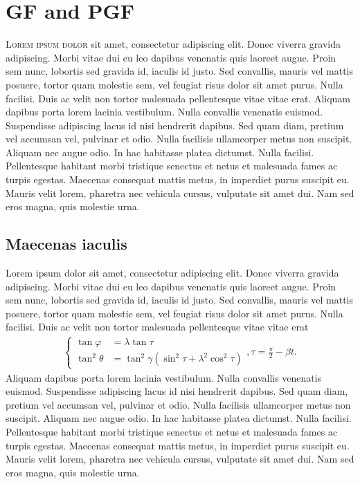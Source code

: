 \chapter{GF and PGF}
\lettrine[lines=4, loversize=-0.1, lraise=0.1]{L}{orem ipsum dolor} sit amet, consectetur adipiscing elit. Donec viverra gravida adipiscing. Morbi vitae dui eu leo dapibus venenatis quis laoreet augue. Proin sem nunc, lobortis sed gravida id, iaculis id justo. Sed convallis, mauris vel mattis posuere, tortor quam molestie sem, vel feugiat risus dolor sit amet purus. Nulla facilisi. Duis ac velit non tortor malesuada pellentesque vitae vitae erat. Aliquam dapibus porta lorem lacinia vestibulum. Nulla convallis venenatis euismod. Suspendisse adipiscing lacus id nisi hendrerit dapibus. Sed quam diam, pretium vel accumsan vel, pulvinar et odio. Nulla facilisis ullamcorper metus non suscipit. Aliquam nec augue odio. In hac habitasse platea dictumst. Nulla facilisi. Pellentesque habitant morbi tristique senectus et netus et malesuada fames ac turpis egestas. Maecenas consequat mattis metus, in imperdiet purus suscipit eu. Mauris velit lorem, pharetra nec vehicula cursus, vulputate sit amet dui. Nam sed eros magna, quis molestie urna.
\section{Maecenas iaculis}
Lorem ipsum dolor sit amet, consectetur adipiscing elit. Donec viverra gravida adipiscing. Morbi vitae dui eu leo dapibus venenatis quis laoreet augue. Proin sem nunc, lobortis sed gravida id, iaculis id justo. Sed convallis, mauris vel mattis posuere, tortor quam molestie sem, vel feugiat risus dolor sit amet purus. Nulla facilisi. Duis ac velit non tortor malesuada pellentesque vitae vitae erat
\begin{gather*}
\left\{\begin{split}
\tan \varphi &= \lambda \tan \tau \\
\tan^2 \theta &= \tan^2 \gamma (\sin^2\tau + \lambda^2 \cos^2\tau)
\end{split}\right., \tau = \frac{\pi}{2}-\beta t.
\end{gather*}
Aliquam dapibus porta lorem lacinia vestibulum. Nulla convallis venenatis euismod. Suspendisse adipiscing lacus id nisi hendrerit dapibus. Sed quam diam, pretium vel accumsan vel, pulvinar et odio. Nulla facilisis ullamcorper metus non suscipit. Aliquam nec augue odio. In hac habitasse platea dictumst. Nulla facilisi. Pellentesque habitant morbi tristique senectus et netus et malesuada fames ac turpis egestas. Maecenas consequat mattis metus, in imperdiet purus suscipit eu. Mauris velit lorem, pharetra nec vehicula cursus, vulputate sit amet dui. Nam sed eros magna, quis molestie urna.

